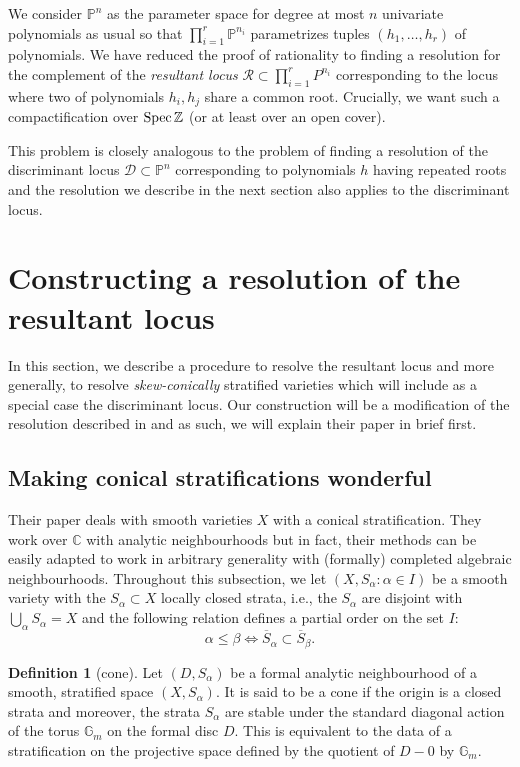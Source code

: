 \documentclass[10pt]{article}
\theoremstyle{plain}
\theoremstyle{definition}
\newtheorem{definition}[theorem]{Definition}
\numberwithin{equation}{section}
\begin{document}
We consider $\mathbb P^n$ as the parameter space for degree at most $n$ univariate polynomials as usual so that $\prod_{i=1}^r\mathbb P^{n_i}$ parametrizes tuples $(h_1,\dots,h_r)$ of polynomials. We have reduced the proof of rationality to finding a resolution for the complement of the \emph{resultant locus} $\mathcal R \subset \mathbb \prod_{i=1}^rP^{n_i}$ corresponding to the locus where two of polynomials $h_i,h_j$ share a common root. Crucially, we want such a compactification over $\operatorname{Spec} \mathbb Z$ (or at least over an open cover).

This problem is closely analogous to the problem of finding a resolution of the discriminant locus $\mathcal D \subset \mathbb P^n$ corresponding to polynomials $h$ having repeated roots and the resolution we describe in the next section also applies to the discriminant locus.

\section{Constructing a resolution of the resultant locus}\label{sec: resolving resultant locus}

In this section, we describe a procedure to resolve the resultant locus and more generally, to resolve \emph{skew-conically} stratified varieties which will include as a special case the discriminant locus. Our construction will be a modification of the resolution described in \cite{macpherson1998making} and as such, we will explain their paper in brief first.

\subsection{Making conical stratifications wonderful}

Their paper deals with smooth varieties $X$ with a conical stratification. They work over $\mathbb C$ with analytic neighbourhoods but in fact, their methods can be easily adapted to work in arbitrary generality with (formally) completed algebraic neighbourhoods. Throughout this subsection, we let $(X,S_{\alpha} : \alpha \in I)$ be a smooth variety with the $S_\alpha \subset X$ locally closed strata, i.e., the $S_\alpha$ are disjoint  with $\bigcup_\alpha S_\alpha = X$ and the following relation defines a partial order on the set $I$: 
$$\alpha \leq \beta \iff \overline{S}_\alpha \subset \overline{S}_\beta.$$ 

\begin{definition}[cone]
    Let $(D,S_\alpha)$ be a formal analytic neighbourhood of a smooth, stratified space $(X,S_\alpha)$. It is said to be a cone if the origin is a closed strata and moreover, the strata $S_\alpha$ are stable under the standard diagonal action of the torus $\mathbb G_m$ on the formal disc $D$. This is equivalent to the data of a stratification on the projective space defined by the quotient of $D-0$ by $\mathbb G_m$.
\end{definition}
\end{document}

